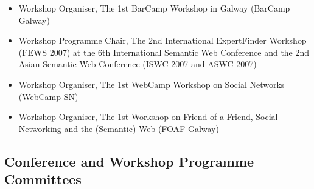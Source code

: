 \documentclass[10pt,a4paper]{res} %
\begin{document}
\begin{resume}
\begin{itemize}
\item Workshop Organiser, The 1st BarCamp Workshop in Galway (BarCamp Galway)
\item Workshop Programme Chair, The 2nd International ExpertFinder Workshop (FEWS 2007) at the 6th International Semantic Web Conference and the 2nd Asian Semantic Web Conference (ISWC 2007 and ASWC 2007)
\item Workshop Organiser, The 1st WebCamp Workshop on Social Networks (WebCamp SN)
\item Workshop Organiser, The 1st Workshop on Friend of a Friend, Social Networking and the (Semantic) Web (FOAF Galway)
\end{itemize}

\subsection*{Conference and Workshop Programme Committees}


\end{resume}
\end{document}
